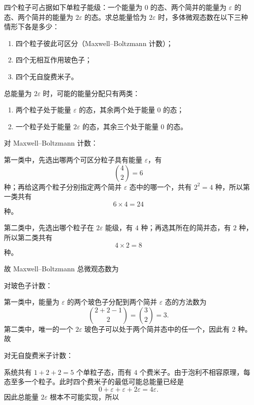\begin{question}[16分]
四个粒子可占据如下单粒子能级：一个能量为 $0$ 的态、两个简并的能量为 $\varepsilon$ 的态、两个简并的能量为 $2\varepsilon$ 的态。求总能量恰为 $2\varepsilon$ 时，多体微观态数在以下三种情形下各是多少：
\begin{enumerate}[label=(\arabic*),leftmargin=2.8em,itemsep=0.2em]
\item 四个粒子彼此可区分（Maxwell--Boltzmann 计数）；
\item 四个无相互作用玻色子；
\item 四个无自旋费米子。
\end{enumerate}
\begin{solution}

总能量为 $2\varepsilon$ 时，可能的能量分配只有两类：

\begin{enumerate}[label=(\arabic*),leftmargin=2.4em,itemsep=0.2em]
\item 两个粒子处于能量 $\varepsilon$ 的态，其余两个处于能量 $0$ 的态；
\item 一个粒子处于能量 $2\varepsilon$ 的态，其余三个处于能量 $0$ 的态。
\end{enumerate}

对 Maxwell--Boltzmann 计数：

第一类中，先选出哪两个可区分粒子具有能量 $\varepsilon$，有
\[
\binom{4}{2}=6
\]
种；再给这两个粒子分别指定两个简并 $\varepsilon$ 态中的哪一个，共有 $2^2=4$ 种，所以第一类共有
\[
6\times4=24
\]
种。

第二类中，先选出哪个粒子在 $2\varepsilon$ 能级，有 $4$ 种；再选其所在的简并态，有 $2$ 种，所以第二类共有
\[
4\times2=8
\]
种。

故 Maxwell--Boltzmann 总微观态数为

对玻色子计数：

第一类中，能量为 $\varepsilon$ 的两个玻色子分配到两个简并 $\varepsilon$ 态的方法数为
\[
\binom{2+2-1}{2}=\binom32=3.
\]
第二类中，唯一的一个 $2\varepsilon$ 玻色子可以处于两个简并态中的任一个，因此有 $2$ 种。故

对无自旋费米子计数：

系统共有 $1+2+2=5$ 个单粒子态，而有 $4$ 个费米子。由于泡利不相容原理，每态至多一个粒子。此时四个费米子的最低可能总能量已经是
\[
0+\varepsilon+\varepsilon+2\varepsilon=4\varepsilon.
\]
因此总能量 $2\varepsilon$ 根本不可能实现，所以
\end{solution}
\end{question}

